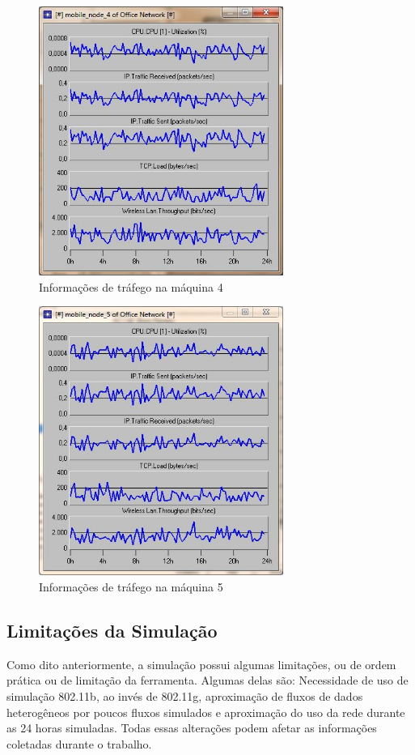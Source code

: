 \documentclass[brazil,times,12pt]{abnt}
\begin{document}
\begin{figure}[H]
\begin{center}
  \includegraphics[width=80mm]{SimulacaoRede/Maquina4.jpg}
  \caption[trafego-maquina4]{Informações de tráfego na máquina 4}
  \label{trafego-maquina4}
\end{center}
\end{figure}

\begin{figure}[H]
\begin{center}
  \includegraphics[width=80mm]{SimulacaoRede/Maquina5.jpg}
  \caption[trafego-maquina5]{Informações de tráfego na máquina 5}
  \label{trafego-maquina5}
\end{center}
\end{figure}

\subsection*{Limitações da Simulação}
Como dito anteriormente, a simulação possui algumas limitações, ou de ordem
prática ou de limitação da ferramenta. Algumas delas são: Necessidade de uso de
simulação 802.11b, ao invés de 802.11g, aproximação de fluxos de dados
heterogêneos por poucos fluxos simulados e aproximação do uso da rede durante as
24 horas simuladas. Todas essas alterações podem afetar as informações coletadas
durante o trabalho.
\end{document}
